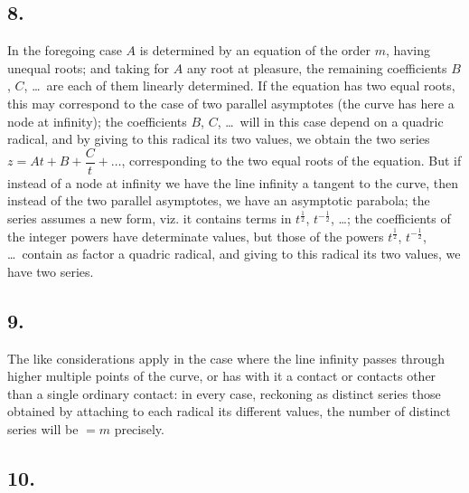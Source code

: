 \documentclass[11pt,a4paper]{article}
\theoremstyle{definition}
\begin{document}
\subsection*{8.}

In the foregoing case $A$ is determined by an equation of the order $m$, having unequal roots; and taking for $A$ any root at pleasure, the remaining coefficients $B$, $C$, \ldots\ are each of them linearly determined. If the equation has two equal roots, this may correspond to the case of two parallel asymptotes (the curve has here a node at infinity); the coefficients $B$, $C$, \ldots\ will in this case depend on a quadric radical, and by giving to this radical its two values, we obtain the two series $z = At + B + \dfrac{C}{t} + \ldots$, corresponding to the two equal roots of the equation. But if instead of a node at infinity we have the line infinity a tangent to the curve, then instead of the two parallel asymptotes, we have an asymptotic parabola; the series assumes a new form, viz. it contains terms in $t^{\frac{1}{2}}$, $t^{-\frac{1}{2}}$, \ldots; the coefficients of the integer powers have determinate values, but those of the powers $t^{\frac{1}{2}}$, $t^{-\frac{1}{2}}$, \ldots\ contain as factor a quadric radical, and giving to this radical its two values, we have two series.

\subsection*{9.}

The like considerations apply in the case where the line infinity passes through higher multiple points of the curve, or has with it a contact or contacts other than a single ordinary contact: in every case, reckoning as distinct series those obtained by attaching to each radical its different values, the number of distinct series will be $= m$ precisely.

\subsection*{10.}
\end{document}

